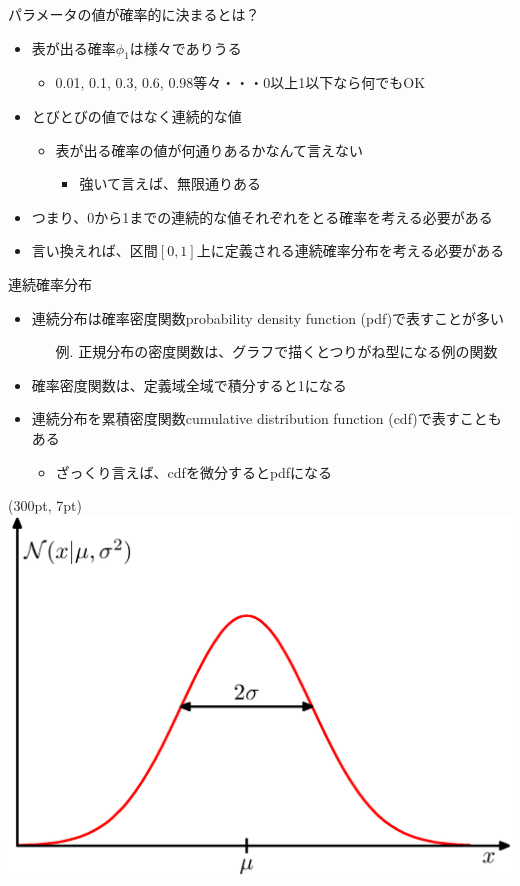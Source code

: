\documentclass[aspectratio=169,unicode,dvipdfmx,14pt]{beamer}
\begin{document}
\begin{frame}{パラメータの値が確率的に決まるとは？}
\begin{itemize}
\item 表が出る確率$\phi_1$は様々でありうる
\begin{itemize}
\item 0.01, 0.1, 0.3, 0.6, 0.98等々・・・0以上1以下なら何でもOK
\end{itemize}
\item とびとびの値ではなく連続的な値
\begin{itemize}
\item 表が出る確率の値が何通りあるかなんて言えない
\begin{itemize}
\item 強いて言えば、無限通りある
\end{itemize}
\end{itemize}
\item つまり、0から1までの連続的な値それぞれをとる確率を考える必要がある
\item 言い換えれば、区間$[0,1]$上に定義される連続確率分布を考える必要がある
\end{itemize}
\end{frame}

\begin{frame}{連続確率分布}
\begin{itemize}
\item 連続分布は確率密度関数probability density function (pdf)で表すことが多い
\begin{itemize}
\item[例.] 正規分布の密度関数は、グラフで描くとつりがね型になる例の関数
\end{itemize}
\item 確率密度関数は、定義域全域で積分すると1になる
\item 連続分布を累積密度関数cumulative distribution function (cdf)で表すこともある
\begin{itemize}
\item ざっくり言えば、cdfを微分するとpdfになる
\end{itemize}
\end{itemize}
\begin{textblock*}{0.4\linewidth}(300pt, 7pt)
    \centering
    \includegraphics[width=0.5\linewidth]{Figure1.13.png}
\end{textblock*}
\end{frame}
\end{document}
